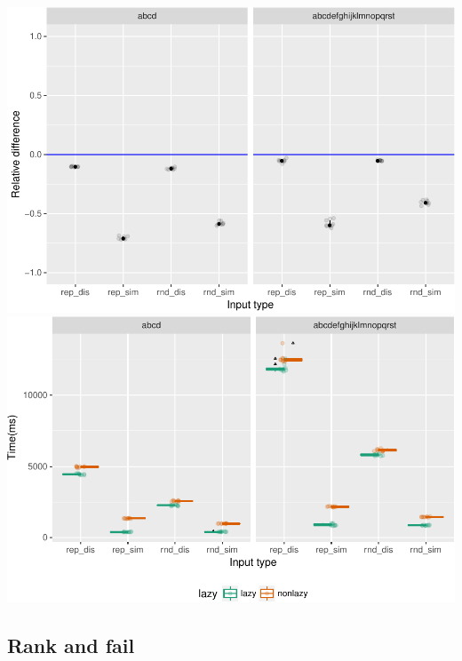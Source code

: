 \documentclass[]{article}
\begin{document}
\includegraphics{sea_2018_files/figure-latex/lazy_plot-1.pdf}
\includegraphics{sea_2018_files/figure-latex/lazy_plot-2.pdf}

\subsection{Rank and fail}\label{rank-and-fail}
\end{document}
